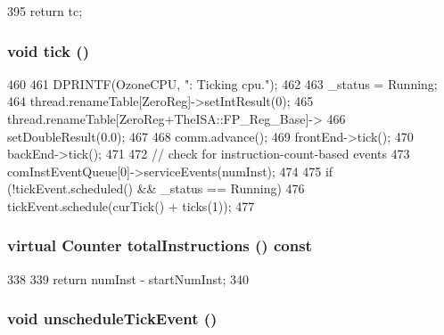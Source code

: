 \begin{DoxyCode}
395 { return tc; }
\end{DoxyCode}
\hypertarget{classOzoneCPU_a873dd91783f9efb4a590aded1f70d6b0}{
\subsubsection[{tick}]{\setlength{\rightskip}{0pt plus 5cm}void tick ()}}
\label{classOzoneCPU_a873dd91783f9efb4a590aded1f70d6b0}



\begin{DoxyCode}
460 {
461     DPRINTF(OzoneCPU, "\n\nOzoneCPU: Ticking cpu.\n");
462 
463     _status = Running;
464     thread.renameTable[ZeroReg]->setIntResult(0);
465     thread.renameTable[ZeroReg+TheISA::FP_Reg_Base]->
466         setDoubleResult(0.0);
467 
468     comm.advance();
469     frontEnd->tick();
470     backEnd->tick();
471 
472     // check for instruction-count-based events
473     comInstEventQueue[0]->serviceEvents(numInst);
474 
475     if (!tickEvent.scheduled() && _status == Running)
476         tickEvent.schedule(curTick() + ticks(1));
477 }
\end{DoxyCode}
\hypertarget{classOzoneCPU_ac022175ac3b2a7117d4c6c283f1ac278}{
\subsubsection[{totalInstructions}]{\setlength{\rightskip}{0pt plus 5cm}virtual {\bf Counter} totalInstructions () const}}
\label{classOzoneCPU_ac022175ac3b2a7117d4c6c283f1ac278}



\begin{DoxyCode}
338     {
339         return numInst - startNumInst;
340     }
\end{DoxyCode}
\hypertarget{classOzoneCPU_ad819e7898bd94721d107a35fde764390}{
\subsubsection[{unscheduleTickEvent}]{\setlength{\rightskip}{0pt plus 5cm}void unscheduleTickEvent ()}}
\label{classOzoneCPU_ad819e7898bd94721d107a35fde764390}



